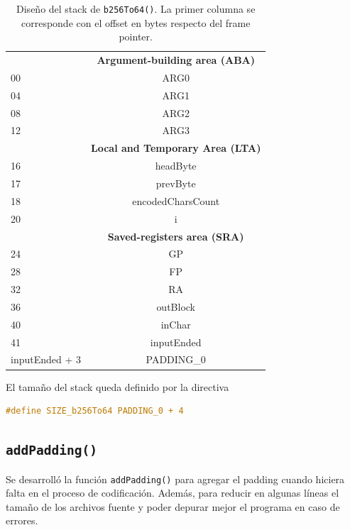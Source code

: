 	\begin{table}[H]
		\centering
		\begin{tabular}{@{}l|c|@{}}
			\cmidrule(l){2-2} 
			\multicolumn{1}{c|}{\textbf{}} & \textbf{Argument-building area (ABA)} \\ \cmidrule(l){2-2} 
			00 & ARG0 \\ \cmidrule(l){2-2} 
			04 & ARG1 \\ \cmidrule(l){2-2} 
			08 & ARG2 \\ \cmidrule(l){2-2}
			12 & ARG3 \\ \cmidrule(l){2-2} 
			\multicolumn{1}{c|}{\textbf{}} & \textbf{Local and Temporary Area (LTA)} \\ \cmidrule(l){2-2} 
			16 & headByte \\ \cmidrule(l){2-2} 
			17 & prevByte \\ \cmidrule(l){2-2} 
			18 & encodedCharsCount \\ \cmidrule(l){2-2} 
			20 & i \\ \cmidrule(l){2-2} 
			\multicolumn{1}{c|}{\textbf{}} & \textbf{Saved-registers area (SRA)} \\ \cmidrule(l){2-2} 
			24 & GP \\ \cmidrule(l){2-2} 
			28 & FP \\ \cmidrule(l){2-2} 
			32 & RA \\ \cmidrule(l){2-2} 
			36 & outBlock \\ \cmidrule(l){2-2} 
			40 & inChar \\ \cmidrule(l){2-2} 
			41 & inputEnded \\ \cmidrule(l){2-2} 
			inputEnded + 3 & PADDING\_0 \\ \cmidrule(l){2-2} 
		\end{tabular}
		\caption{Diseño del stack de \texttt{b256To64()}. La primer columna se corresponde con el offset en bytes respecto del frame pointer.}
		\label{stack_b256To64}
	\end{table}
	
	El tamaño del stack queda definido por la directiva
	\begin{lstlisting}[language=C, style=StyleC]
	#define SIZE_b256To64 PADDING_0 + 4
	\end{lstlisting}
	
\subsection{\texttt{addPadding()}}

Se desarrolló la función \texttt{addPadding()} para agregar el padding cuando hiciera falta en el proceso de codificación. Además, para reducir en algunas líneas el tamaño de los archivos fuente y poder depurar mejor el programa en caso de errores.

